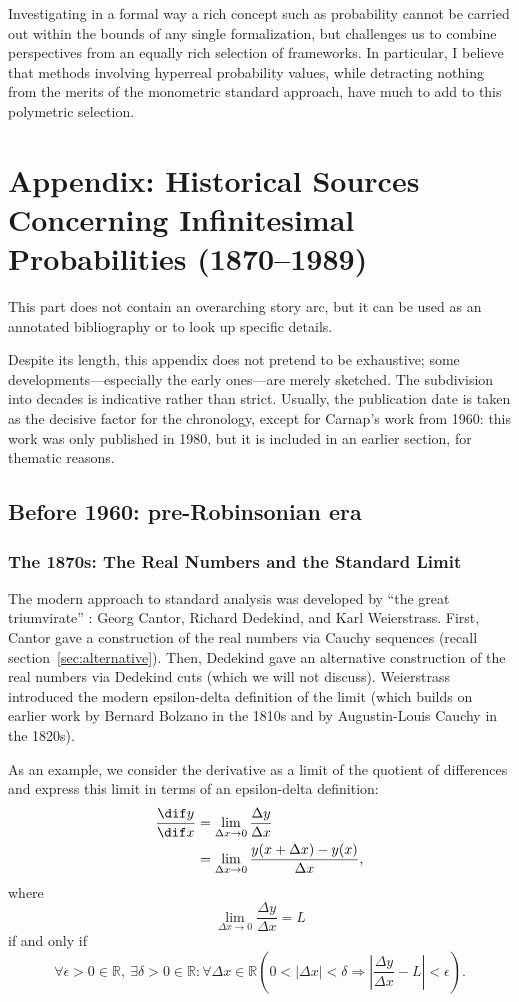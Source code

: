 Investigating in a formal way a rich concept such as probability cannot be carried out within the bounds of any single formalization, but challenges us to combine perspectives from an equally rich selection of frameworks. In particular, I believe that methods involving hyperreal probability values, while detracting nothing from the merits of the monometric standard approach, have much to add to this polymetric selection.


\section[Appendix: Historical Sources]{Appendix: Historical Sources Concerning Infinitesimal Probabilities (1870--1989)}
This part does not contain an overarching story arc, but it can be used as an annotated bibliography or to look up specific details.

Despite its length, this appendix does not pretend to be exhaustive; some developments---especially the early ones---are merely sketched.
The subdivision into decades is indicative rather than strict. Usually, the publication date is taken as the decisive factor for the chronology, except for Carnap's work from 1960: this work was only published in 1980, but it is included in an earlier section, for thematic reasons.

\subsection{Before 1960: pre-Robinsonian era}

\subsubsection*{The 1870s: The Real Numbers and the Standard Limit}\label{sec:standardcalc}
The modern approach to standard analysis was developed by ``the great triumvirate'' \citep[p.~298]{Boyer:1949}: Georg Cantor, Richard Dedekind, and Karl Weierstrass. First, Cantor gave a construction of the real numbers via Cauchy sequences (recall section~\ref{sec:alternative}). Then, Dedekind gave an alternative construction of the real numbers via Dedekind cuts (which we will not discuss). Weierstrass introduced the modern epsilon-delta definition of the limit (which builds on earlier work by Bernard Bolzano in the 1810s and by Augustin-Louis Cauchy in the 1820s).

As an example, we consider the derivative as a limit of the quotient of differences and express this limit in terms of an epsilon-delta definition:
\begin{align*}
\frac{\dif y}{\dif x} &= \lim_{\Delta x\rightarrow0} \frac{\Delta y}{\Delta x}\\
 &= \lim_{\Delta x\rightarrow0} \frac{y(x+\Delta x) - y(x)}{\Delta x},
\end{align*}
where
$$\lim_{\Delta x\rightarrow0} \frac{\Delta y}{\Delta x} = L$$
if and only if
$$\forall \epsilon > 0 \in \mathbb{R}, \ \exists \delta > 0 \in \mathbb{R}: \forall \Delta x \in \mathbb{R} \left( 0 < |\Delta x| < \delta \Rightarrow | \frac{\Delta y}{\Delta x} - L| < \epsilon \right).$$

